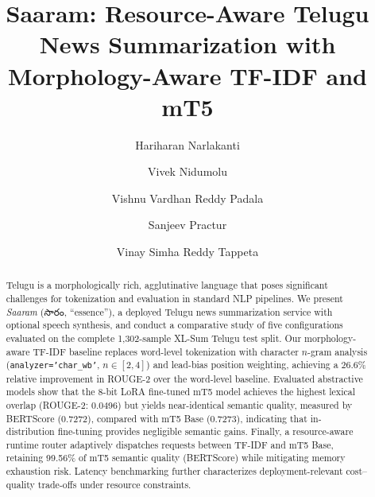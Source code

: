 \documentclass[runningheads]{llncs}
\begin{document}

\title{Saaram: Resource-Aware Telugu News Summarization with Morphology-Aware TF-IDF and mT5}


\author{
  Hariharan Narlakanti \and
  Vivek Nidumolu       \and
  Vishnu Vardhan Reddy Padala \and
  Sanjeev Practur      \and
  Vinay Simha Reddy Tappeta
}


\maketitle

\begin{abstract}
Telugu is a morphologically rich, agglutinative language that poses significant challenges for tokenization and evaluation in standard NLP pipelines. We present
\textit{Saaram} ({\telugufont సారం}, ``essence''), a deployed Telugu news summarization service with optional speech synthesis, and conduct a comparative study of five configurations evaluated on the complete 1,302-sample XL-Sum Telugu test split. Our morphology-aware TF-IDF baseline replaces word-level tokenization with character $n$-gram analysis (\texttt{analyzer='char\_wb'}, $n \in [2,4]$) and lead-bias position weighting, achieving a 26.6\% relative improvement in ROUGE-2 over the word-level baseline. Evaluated abstractive models show that the 8-bit LoRA fine-tuned mT5 model achieves the highest lexical overlap (ROUGE-2: 0.0496) but yields near-identical semantic quality, measured by BERTScore (0.7272), compared with mT5 Base (0.7273), indicating that in-distribution fine-tuning provides negligible semantic gains. Finally, a resource-aware runtime router adaptively dispatches requests between TF-IDF and mT5 Base, retaining 99.56\% of mT5 semantic quality (BERTScore) while mitigating memory exhaustion risk. Latency benchmarking further characterizes deployment-relevant cost--quality trade-offs under resource constraints.
\end{abstract}
\end{document}
